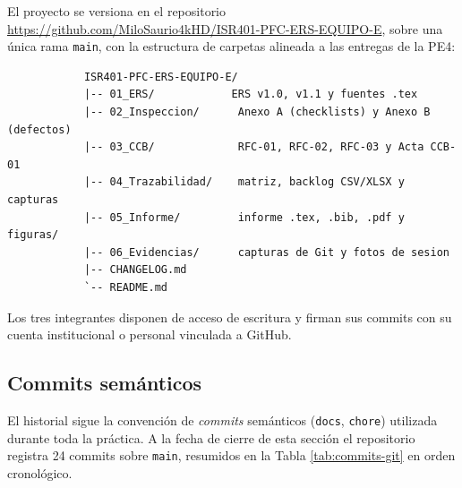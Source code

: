 \documentclass[journal,onecolumn]{IEEEtran}
\begin{document}
	El proyecto se versiona en el repositorio \url{https://github.com/MiloSaurio4kHD/ISR401-PFC-ERS-EQUIPO-E},
	sobre una única rama \texttt{main}, con la estructura de carpetas alineada a las entregas de la PE4:
	
	\begin{center}
		\begin{verbatim}
			ISR401-PFC-ERS-EQUIPO-E/
			|-- 01_ERS/            ERS v1.0, v1.1 y fuentes .tex
			|-- 02_Inspeccion/      Anexo A (checklists) y Anexo B (defectos)
			|-- 03_CCB/             RFC-01, RFC-02, RFC-03 y Acta CCB-01
			|-- 04_Trazabilidad/    matriz, backlog CSV/XLSX y capturas
			|-- 05_Informe/         informe .tex, .bib, .pdf y figuras/
			|-- 06_Evidencias/      capturas de Git y fotos de sesion
			|-- CHANGELOG.md
			`-- README.md
		\end{verbatim}
	\end{center}
	
	Los tres integrantes disponen de acceso de escritura y firman sus commits con su cuenta
	institucional o personal vinculada a GitHub.
	
	\subsection{Commits semánticos}
	
	El historial sigue la convención de \emph{commits} semánticos (\texttt{docs}, \texttt{chore})
	utilizada durante toda la práctica. A la fecha de cierre de esta sección el repositorio registra 24
	commits sobre \texttt{main}, resumidos en la Tabla \ref{tab:commits-git} en orden cronológico.
	
\end{document}

